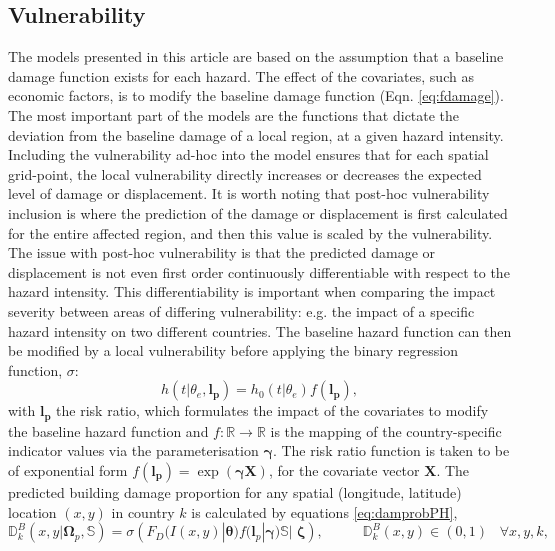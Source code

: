 \documentclass[10pt,a4paper]{article}
\begin{document}
\begin{multicols}{1}
\subsection{Vulnerability}\label{sec:survmodel}
The models presented in this article are based on the assumption that a baseline damage function exists for each hazard. The effect of the covariates, such as economic factors, is to modify the baseline damage function (Eqn. \ref{eq:fdamage}). The most important part of the models are the functions that dictate the deviation from the baseline damage of a local region, at a given hazard intensity. Including the vulnerability ad-hoc into the model ensures that for each spatial grid-point, the local vulnerability directly increases or decreases the expected level of damage or displacement. It is worth noting that post-hoc vulnerability inclusion is where the prediction of the damage or displacement is first calculated for the entire affected region, and then this value is scaled by the vulnerability. The issue with post-hoc vulnerability is that the predicted damage or displacement is not even first order continuously differentiable with respect to the hazard intensity. This differentiability is important when comparing the impact severity between areas of differing vulnerability: e.g. the impact of a specific hazard intensity on two different countries. The baseline hazard function can then be modified by a local vulnerability before applying the binary regression function, $\sigma$:  
\begin{equation}\label{eq:h}
  h(t|\theta_e,\boldsymbol{l_p})=h_0\left(t|\theta_e\right)f(\boldsymbol{l_p}),
\end{equation}
with $\boldsymbol{l_p}$ the risk ratio, which formulates the impact of the covariates to modify the baseline hazard function and $f:\mathbb{R}\rightarrow\mathbb{R}$ is the mapping of the country-specific indicator values via the parameterisation $\boldsymbol{\gamma}$. The risk ratio function is taken to be of exponential form $f(\boldsymbol{l_p})=\exp(\boldsymbol{\gamma}\mathbf{X})$, for the covariate vector $\mathbf{X}$. The predicted building damage proportion for any spatial (longitude, latitude) location $(x,y)$ in country $k$ is calculated by equations \ref{eq:damprobPH},
\begin{equation}\label{eq:damprobPH}
  \mathbb{D}^{B}_k(x,y|\boldsymbol{\Omega}_p,\mathbb{S})=\sigma\left(F_D\big(I(x,y)|\boldsymbol{\theta}\big)f\big(\boldsymbol{l}_p|\boldsymbol{\gamma}\big)\mathbb{S}\bigg|\;\boldsymbol{\zeta}\right),\;\;\;\;\;\;\;\;\;\; \mathbb{D}^{B}_k(x,y) \in (0,1) \;\;\; \forall x,y,k,

\end{equation}
\end{multicols}
\end{document}
